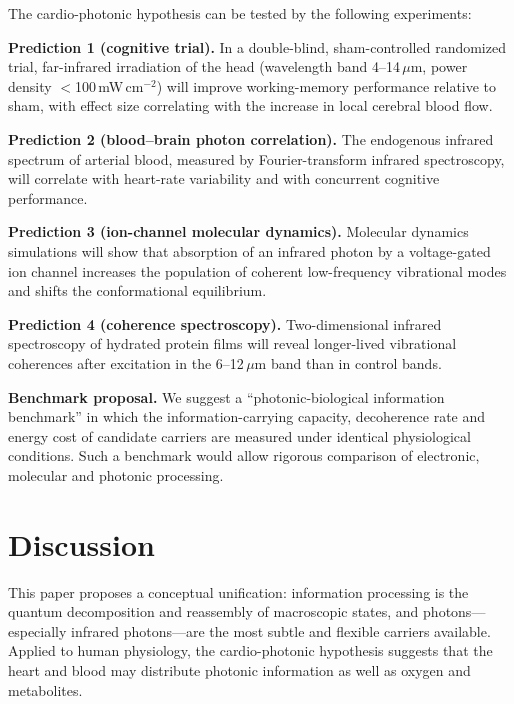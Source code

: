 \documentclass[11pt,a4paper]{article}
\begin{document}
The cardio-photonic hypothesis can be tested by the following experiments:

\textbf{Prediction 1 (cognitive trial).} In a double-blind, sham-controlled randomized trial, far-infrared irradiation of the head (wavelength band 4--14\,$\mu$m, power density $<$100\,mW\,cm$^{-2}$) will improve working-memory performance relative to sham, with effect size correlating with the increase in local cerebral blood flow.

\textbf{Prediction 2 (blood--brain photon correlation).} The endogenous infrared spectrum of arterial blood, measured by Fourier-transform infrared spectroscopy, will correlate with heart-rate variability and with concurrent cognitive performance.

\textbf{Prediction 3 (ion-channel molecular dynamics).} Molecular dynamics simulations will show that absorption of an infrared photon by a voltage-gated ion channel increases the population of coherent low-frequency vibrational modes and shifts the conformational equilibrium.

\textbf{Prediction 4 (coherence spectroscopy).} Two-dimensional infrared spectroscopy of hydrated protein films will reveal longer-lived vibrational coherences after excitation in the 6--12\,$\mu$m band than in control bands.

\textbf{Benchmark proposal.} We suggest a ``photonic-biological information benchmark'' in which the information-carrying capacity, decoherence rate and energy cost of candidate carriers are measured under identical physiological conditions. Such a benchmark would allow rigorous comparison of electronic, molecular and photonic processing.

\section*{Discussion}

This paper proposes a conceptual unification: information processing is the quantum decomposition and reassembly of macroscopic states, and photons---especially infrared photons---are the most subtle and flexible carriers available. Applied to human physiology, the cardio-photonic hypothesis suggests that the heart and blood may distribute photonic information as well as oxygen and metabolites.
\end{document}

